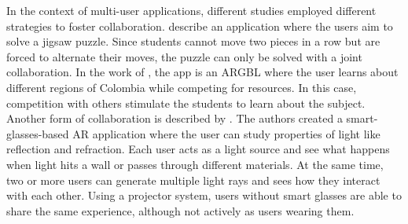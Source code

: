 In the context of multi-user applications, different studies employed different strategies to foster collaboration. \citet{boonbrahm2016interactive} describe an application where the users aim to solve a jigsaw puzzle. Since students cannot move two pieces in a row but are forced to alternate their moves, the puzzle can only be solved with a joint collaboration. In the work of  \citet{ortiz2018evaluation}, the app is an \gls{ARGBL} where the user learns about different regions of Colombia while competing for resources. In this case, competition with others stimulate the students to learn about the subject. Another form of collaboration is described by \citet{oh2016designing}. The authors created a smart-glasses-based AR application where the user can study properties of light like reflection and refraction. Each user acts as a light source and see what happens when light hits a wall or passes through different materials. At the same time, two or more users can generate multiple light rays and sees how they interact with each other. Using a projector system, users without smart glasses are able to share the same experience, although not actively as users wearing them.
